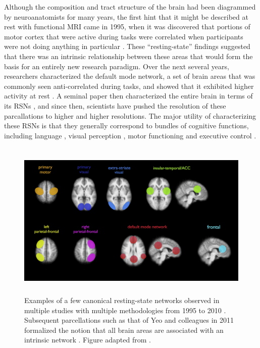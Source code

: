 Although the composition and tract structure of the brain had been diagrammed by neuroanatomists for many years, the first hint that it might be described at rest with functional MRI came in 1995, when it was discovered that portions of motor cortex that were active during tasks were correlated when participants were not doing anything in particular \citep{Biswal1995}. These ``resting-state'' findings suggested that there was an intrinsic relationship between these areas that would form the basis for an entirely new research paradigm. Over the next several years, researchers characterized the default mode network, a set of brain areas that was commonly seen anti-correlated during tasks, and showed that it exhibited higher activity at rest \citep{Greicius2003}. A seminal paper then characterized the entire brain in terms of its RSNs \citep{Yeo2011}, and since then, scientists have pushed the resolution of these parcallations to higher and higher resolutions. The major utility of characterizing these RSNs is that they generally correspond to bundles of cognitive functions, including language \citep{Cordes2000, Hampson2002}, visual perception \citep{Simmons2012}, motor functioning \citep{Biswal1995} and executive control \citep{Seeley2007}. 

\begin{figure}[t]
    \centering
    \includegraphics[height=3in]{images/ch1-ica.png}
    \caption[Examples of canonical resting-state networks.]{Examples of a few canonical resting-state networks observed in multiple studies with multiple methodologies from 1995 to 2010 \citep{Biswal1995, Beckmann2005, DeLuca2006,VandenHeuvel2009}. Subsequent parcellations such as that of Yeo and colleagues in 2011 formalized the notion that all brain areas are associated with an intrinsic network \citep{Yeo2011}. Figure adapted from \citep{VandenHeuvel2010}.}
    \label{fig:ch1-ica}
\end{figure}

